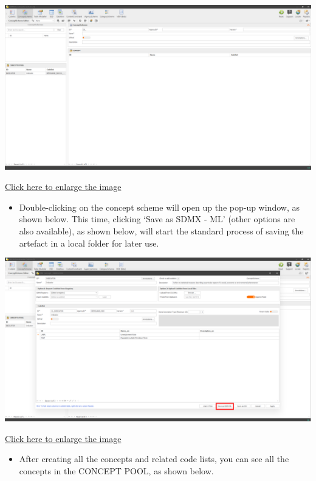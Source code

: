 \documentclass[
]{book}
\providecommand{\tightlist}{%
  \setlength{\itemsep}{0pt}\setlength{\parskip}{0pt}}
\begin{document}
\begin{center}\includegraphics[width=1\linewidth]{./images/image244} \end{center}

\href{images/image244.png}{Click here to enlarge the image}

\begin{itemize}
\tightlist
\item
  Double-clicking on the concept scheme will open up the pop-up window, as shown below. This time, clicking `Save as SDMX - ML' (other options are also available), as shown below, will start the standard process of saving the artefact in a local folder for later use.
\end{itemize}

\begin{center}\includegraphics[width=1\linewidth]{./images/image245} \end{center}

\href{images/image245.png}{Click here to enlarge the image}

\begin{itemize}
\tightlist
\item
  After creating all the concepts and related code lists, you can see all the concepts in the CONCEPT POOL, as shown below.
\end{itemize}
\end{document}
